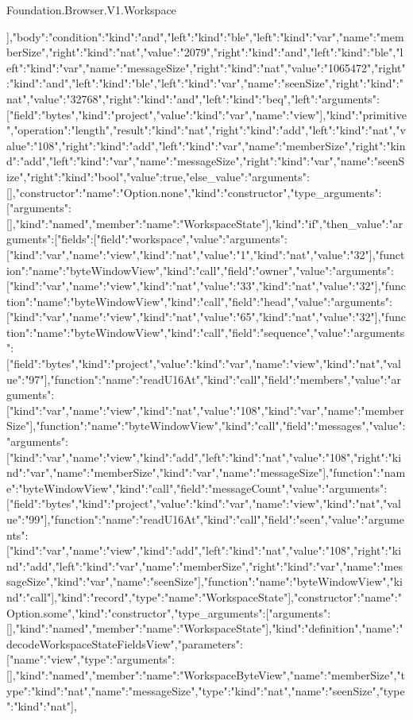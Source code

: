 \begin{lexlean}{Foundation.Browser.V1.Workspace}
\begin{semanticmodule}
],"body":{"condition":{"kind":"and","left":{"kind":"ble","left":{"kind":"var","name":"memberSize"},"right":{"kind":"nat","value":"2079"}},"right":{"kind":"and","left":{"kind":"ble","left":{"kind":"var","name":"messageSize"},"right":{"kind":"nat","value":"1065472"}},"right":{"kind":"and","left":{"kind":"ble","left":{"kind":"var","name":"seenSize"},"right":{"kind":"nat","value":"32768"}},"right":{"kind":"and","left":{"kind":"beq","left":{"arguments":[{"field":"bytes","kind":"project","value":{"kind":"var","name":"view"}}],"kind":"primitive","operation":"length","result":{"kind":"nat"}},"right":{"kind":"add","left":{"kind":"nat","value":"108"},"right":{"kind":"add","left":{"kind":"var","name":"memberSize"},"right":{"kind":"add","left":{"kind":"var","name":"messageSize"},"right":{"kind":"var","name":"seenSize"}}}}},"right":{"kind":"bool","value":true}}}}},"else_value":{"arguments":[],"constructor":{"name":"Option.none"},"kind":"constructor","type_arguments":[{"arguments":[],"kind":"named","member":{"name":"WorkspaceState"}}]},"kind":"if","then_value":{"arguments":[{"fields":[{"field":"workspace","value":{"arguments":[{"kind":"var","name":"view"},{"kind":"nat","value":"1"},{"kind":"nat","value":"32"}],"function":{"name":"byteWindowView"},"kind":"call"}},{"field":"owner","value":{"arguments":[{"kind":"var","name":"view"},{"kind":"nat","value":"33"},{"kind":"nat","value":"32"}],"function":{"name":"byteWindowView"},"kind":"call"}},{"field":"head","value":{"arguments":[{"kind":"var","name":"view"},{"kind":"nat","value":"65"},{"kind":"nat","value":"32"}],"function":{"name":"byteWindowView"},"kind":"call"}},{"field":"sequence","value":{"arguments":[{"field":"bytes","kind":"project","value":{"kind":"var","name":"view"}},{"kind":"nat","value":"97"}],"function":{"name":"readU16At"},"kind":"call"}},{"field":"members","value":{"arguments":[{"kind":"var","name":"view"},{"kind":"nat","value":"108"},{"kind":"var","name":"memberSize"}],"function":{"name":"byteWindowView"},"kind":"call"}},{"field":"messages","value":{"arguments":[{"kind":"var","name":"view"},{"kind":"add","left":{"kind":"nat","value":"108"},"right":{"kind":"var","name":"memberSize"}},{"kind":"var","name":"messageSize"}],"function":{"name":"byteWindowView"},"kind":"call"}},{"field":"messageCount","value":{"arguments":[{"field":"bytes","kind":"project","value":{"kind":"var","name":"view"}},{"kind":"nat","value":"99"}],"function":{"name":"readU16At"},"kind":"call"}},{"field":"seen","value":{"arguments":[{"kind":"var","name":"view"},{"kind":"add","left":{"kind":"nat","value":"108"},"right":{"kind":"add","left":{"kind":"var","name":"memberSize"},"right":{"kind":"var","name":"messageSize"}}},{"kind":"var","name":"seenSize"}],"function":{"name":"byteWindowView"},"kind":"call"}}],"kind":"record","type":{"name":"WorkspaceState"}}],"constructor":{"name":"Option.some"},"kind":"constructor","type_arguments":[{"arguments":[],"kind":"named","member":{"name":"WorkspaceState"}}]}},"kind":"definition","name":"decodeWorkspaceStateFieldsView","parameters":[{"name":"view","type":{"arguments":[],"kind":"named","member":{"name":"WorkspaceByteView"}}},{"name":"memberSize","type":{"kind":"nat"}},{"name":"messageSize","type":{"kind":"nat"}},{"name":"seenSize","type":{"kind":"nat"}}],
\end{semanticmodule}
\end{lexlean}
